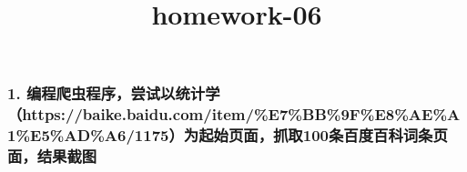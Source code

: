 \documentclass[11pt]{article}
\title{homework-06}
\begin{document}
    
    
    \maketitle
    
    

    
    \hypertarget{ux7f16ux7a0bux722cux866bux7a0bux5e8fux5c1dux8bd5ux4ee5ux7edfux8ba1ux5b66httpsbaike.baidu.comiteme7bb9fe8aea1e5ada61175ux4e3aux8d77ux59cbux9875ux9762ux6293ux53d6100ux6761ux767eux5ea6ux767eux79d1ux8bcdux6761ux9875ux9762ux7ed3ux679cux622aux56fe}{%
\subsubsection{1.
编程爬虫程序，尝试以统计学（https://baike.baidu.com/item/\%E7\%BB\%9F\%E8\%AE\%A1\%E5\%AD\%A6/1175）为起始页面，抓取100条百度百科词条页面，结果截图}\label{ux7f16ux7a0bux722cux866bux7a0bux5e8fux5c1dux8bd5ux4ee5ux7edfux8ba1ux5b66httpsbaike.baidu.comiteme7bb9fe8aea1e5ada61175ux4e3aux8d77ux59cbux9875ux9762ux6293ux53d6100ux6761ux767eux5ea6ux767eux79d1ux8bcdux6761ux9875ux9762ux7ed3ux679cux622aux56fe}}
\end{document}
